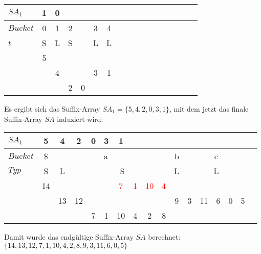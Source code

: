 \begin{center}
  \begin{tabular}{ | l | c | c | c | c | c | c | c | c | c | c | c | c | c | c | c | c | }
    \hline
     $SA_1$ & 1 & 0 & & & & \\ \hline
   $Bucket$ & 0 & 1 & \multicolumn{1}{c}{2} & & 3 & 4 \\ \hline
      $t$   & S & L & \multicolumn{1}{c}{S} & & L & L \\ \hline
            & 5 & & & & &  \\ \hline
            & & 4 & & & 3 & 1 \\ \hline
            & & & 2 & 0 & & \\
    \hline
  \end{tabular}
\end{center}
\bigskip

\noindent Es ergibt sich das Suffix-Array $SA_1 = \{5, 4, 2, 0, 3, 1\}$, mit dem jetzt das finale Suffix-Array $SA$ induziert wird:

\begin{center}
  \begin{tabular}{ | l | c | c | c | c | c | c | c | c | c | c | c | c | c | c | c | c | }
    \hline
     $SA_1$ & 5 & 4 & 2 & 0 & 3 & 1 & & & & & & & & & \\ \hline
   $Bucket$ &\$ & \multicolumn{7}{c}{a} &   & \multicolumn{1}{c}{b} &   & \multicolumn{3}{c}{c} & \\ \hline
      $Typ$ & S & \multicolumn{1}{c}{L} &   & \multicolumn{5}{c}{S} &   & \multicolumn{1}{c}{L} &    & \multicolumn{3}{c}{L} &\\ \hline
            & 14 & & & & & \textcolor{red}{7} & \textcolor{red}{1} & \textcolor{red}{10} & \textcolor{red}{4} & & & & & & \\ \hline
            & & 13 & 12 & & & & & & & 9 & 3 & 11 & 6 & 0 & 5 \\ \hline
            & & & & 7 & 1 & 10 & 4 & 2 & 8 & & & & & & \\
    \hline
  \end{tabular}
\end{center}
\bigskip
Damit wurde das endgültige Suffix-Array $SA$ berechnet: $\{14, 13, 12, 7, 1, 10, 4, 2, 8, 9, 3, 11, 6, 0, 5\}$

